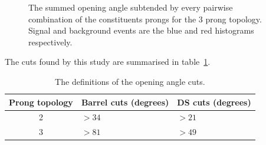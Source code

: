 \begin{figure}%
  \centering
  \caption{The summed opening angle subtended by every pairwise combination of the constituents prongs for the 3 prong topology.  Signal and background events are the blue and red histograms respectively.}
  \label{fig:Sel3OpeningAngle}
\end{figure}
The cuts found by this study are summarised in table~\ref{table:SelOpeningAngle}.
\begin{table}[b!]
  \begin{tabular}{ c l l }
    Prong topology & Barrel cuts (degrees) & DS cuts (degrees) \\ \hline \hline
    2 & $>34$ & $>21$ \\
    3 & $>81$ & $>49$ \\
  \end{tabular}
  \caption{The definitions of the opening angle cuts.}
  \label{table:SelOpeningAngle}
\end{table}
